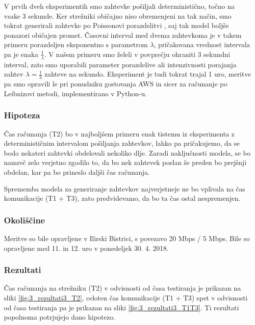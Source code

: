 V prvih dveh eksperimentih smo zahtevke pošiljali deterministično, točno na vsake 3 sekunde.
Ker strežniki običajno niso obremenjeni na tak način, smo tokrat generirali zahtevke po Poissonovi porazdelitvi \cite{3_moskon_mraz_2012}, saj tak model boljše ponazori običajen promet.
Časovni interval med dvema zahtevkoma je v takem primeru porazdeljen eksponentno s parametrom \(\lambda\), pričakovana vrednost intervala pa je enaka \(\frac{1}{\lambda}\).
V našem primeru smo želeli v povprečju ohraniti 3 sekundni interval, zato smo uporabili parameter porazdelive ali intenzivnosti porajanja zahtev \(\lambda=\frac{1}{3}\) zahteve na sekundo.
Eksperiment je tudi tokrat trajal 1 uro, meritve pa smo opravili le pri ponudniku gostovanja AWS in sicer za računanje po Leibnizovi metodi, implementirano v Python-u.

\subsubsection{Hipoteza}

Čas računanja (T2) bo v najboljšem primeru enak tistemu iz eksperimenta z determinističnim intervalom pošiljanja zahtevkov, lahko pa pričakujemo, da se bodo nekateri zahtevki obdelovali nekoliko dlje.
Zaradi naključnosti modela, se bo namreč zelo verjetno zgodilo to, da bo nek zahtevek poslan še preden bo prejšnji obdelan, kar pa bo prineslo daljši čas računanja.

Sprememba modela za generiranje zahtevkov najverjetneje ne bo vplivala na čas komunikacije (T1 + T3), zato predvidevamo, da bo ta čas ostal nespremenjen.

\subsubsection{Okoliščine}

Meritve so bile opravljene v Ilirski Bistrici, s povezavo 20 Mbps / 5 Mbps.
Bile so opravljene med 11. in 12. uro v ponedeljek 30. 4. 2018.

\subsubsection{Rezultati}

Čas računanja na strežniku (T2) v odvisnosti od časa testiranja je prikazan na sliki \ref{fig:3_rezultati3_T2}, celoten čas komunikacije (T1 + T3) spet v odvisnosti od časa testiranja pa je prikazan na sliki \ref{fig:3_rezultati3_T1T3}.
Ti rezultati popolnoma potrjujejo dano hipotezo.

